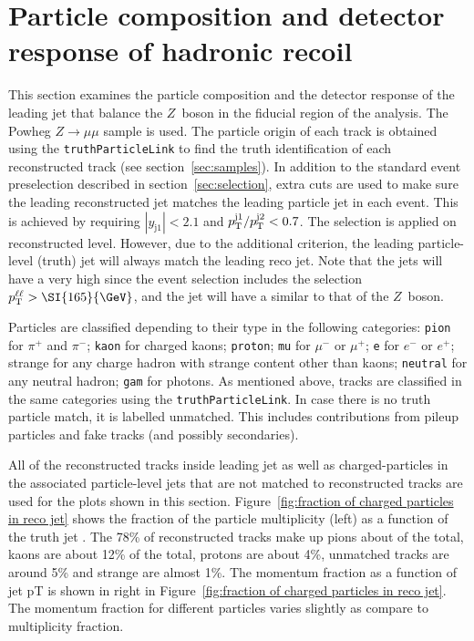 \section{Particle composition and detector response of hadronic recoil}

This section examines the particle composition and the detector response of the leading jet that balance the $Z$~boson in the fiducial region of the analysis. 
The Powheg $Z\to \mu\mu$ sample is used. The particle origin of each track is obtained using the \texttt{truthParticleLink} to find the truth identification of each reconstructed track (see section~\ref{sec:samples}). In addition to the standard event preselection described in section~\ref{sec:selection}, extra cuts are used to make sure the leading reconstructed jet matches the leading particle jet in each event. 
This is achieved by requiring $|y_\mathrm{j1}|<2.1$ and $p_\mathrm{T}^{\mathrm{j1}} / p_\mathrm{T}^{\mathrm{j2}} < 0.7$. The selection is applied on reconstructed level. However, due to the additional criterion, the leading particle-level (truth) jet will always match the leading reco jet. Note that the jets will have a very high \pt{} since the event selection includes the selection $\pTll > \SI{165}{\GeV}$, and the jet will have a similar \pt{} to that of the $Z$~boson.

Particles are classified depending to their type in the following categories: \texttt{pion} for $\pi^+$ and $\pi^-$; \texttt{kaon} for charged kaons; \texttt{proton}; 
\texttt{mu} for $\mu^-$ or $\mu^+$; \texttt{e} for $e^-$ or $e^+$;
strange for any charge hadron with strange content other than kaons; \texttt{neutral} for any neutral hadron; \texttt{gam} for photons. As mentioned above, tracks are classified in the same categories using the \texttt{truthParticleLink}. In case there is no truth particle match, it is labelled unmatched. This includes contributions from pileup particles and fake tracks (and possibly secondaries).


All of the reconstructed tracks inside leading jet as well as charged-particles in the associated particle-level jets that are not matched to reconstructed tracks are used for the plots shown in this section. Figure~\ref{fig:fraction of charged particles in reco jet} shows the fraction of the particle multiplicity (left) as a function of the truth jet \pT. The 78\% of reconstructed tracks make up pions about of the total, kaons are about 12\% of the total, protons are about 4\%, unmatched tracks are around 5\% and strange are almost 1\%. The momentum fraction as a function of jet pT is shown in right in Figure~\ref{fig:fraction of charged particles in reco jet}. The momentum fraction for different particles varies slightly as compare to multiplicity fraction.

